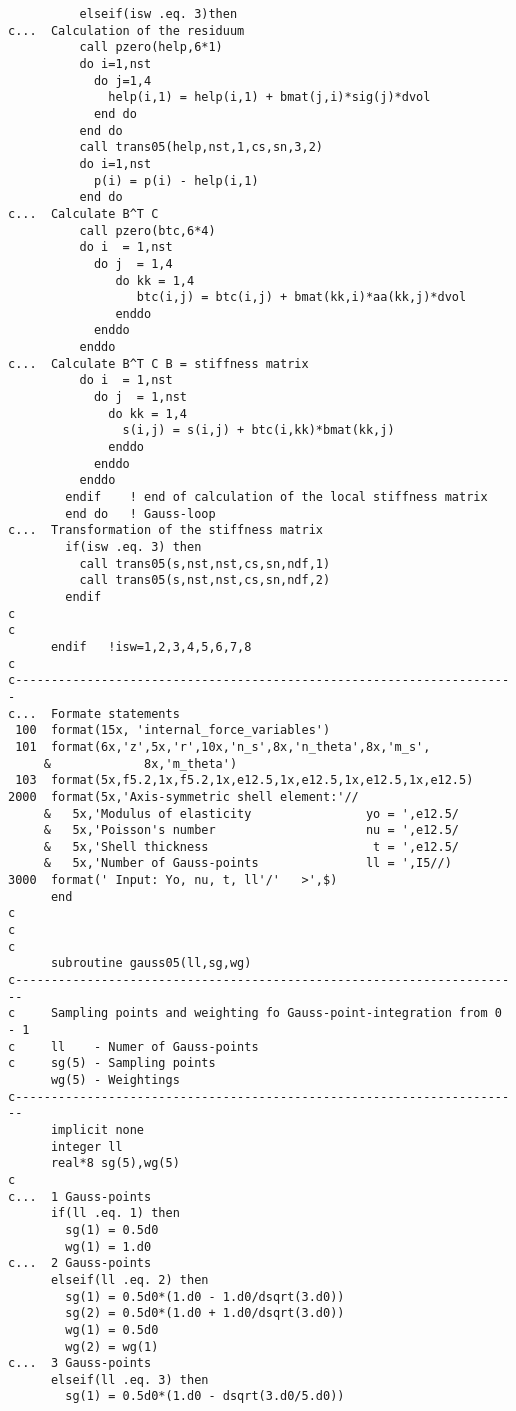 {\begin{verbatim}
          elseif(isw .eq. 3)then
c...  Calculation of the residuum
          call pzero(help,6*1)
          do i=1,nst
            do j=1,4
              help(i,1) = help(i,1) + bmat(j,i)*sig(j)*dvol
            end do
          end do
          call trans05(help,nst,1,cs,sn,3,2)
          do i=1,nst
            p(i) = p(i) - help(i,1)
          end do
c...  Calculate B^T C
          call pzero(btc,6*4)
          do i  = 1,nst
            do j  = 1,4
               do kk = 1,4
                  btc(i,j) = btc(i,j) + bmat(kk,i)*aa(kk,j)*dvol
               enddo
            enddo
          enddo
c...  Calculate B^T C B = stiffness matrix
          do i  = 1,nst
            do j  = 1,nst
              do kk = 1,4
                s(i,j) = s(i,j) + btc(i,kk)*bmat(kk,j)
              enddo
            enddo
          enddo
        endif    ! end of calculation of the local stiffness matrix
        end do   ! Gauss-loop
c...  Transformation of the stiffness matrix
        if(isw .eq. 3) then
          call trans05(s,nst,nst,cs,sn,ndf,1)
          call trans05(s,nst,nst,cs,sn,ndf,2)
        endif
c
c
      endif   !isw=1,2,3,4,5,6,7,8
c
c----------------------------------------------------------------------
c...  Formate statements
 100  format(15x, 'internal_force_variables')
 101  format(6x,'z',5x,'r',10x,'n_s',8x,'n_theta',8x,'m_s',
     &             8x,'m_theta')
 103  format(5x,f5.2,1x,f5.2,1x,e12.5,1x,e12.5,1x,e12.5,1x,e12.5)
2000  format(5x,'Axis-symmetric shell element:'//
     &   5x,'Modulus of elasticity                yo = ',e12.5/
     &   5x,'Poisson's number                     nu = ',e12.5/
     &   5x,'Shell thickness                       t = ',e12.5/
     &   5x,'Number of Gauss-points               ll = ',I5//)
3000  format(' Input: Yo, nu, t, ll'/'   >',$)
      end
c
c
c
      subroutine gauss05(ll,sg,wg)
c-----------------------------------------------------------------------
c     Sampling points and weighting fo Gauss-point-integration from 0 - 1
c     ll    - Numer of Gauss-points
c     sg(5) - Sampling points
      wg(5) - Weightings
c-----------------------------------------------------------------------
      implicit none
      integer ll
      real*8 sg(5),wg(5)
c
c...  1 Gauss-points
      if(ll .eq. 1) then
        sg(1) = 0.5d0
        wg(1) = 1.d0
c...  2 Gauss-points
      elseif(ll .eq. 2) then
        sg(1) = 0.5d0*(1.d0 - 1.d0/dsqrt(3.d0))
        sg(2) = 0.5d0*(1.d0 + 1.d0/dsqrt(3.d0))
        wg(1) = 0.5d0
        wg(2) = wg(1)
c...  3 Gauss-points
      elseif(ll .eq. 3) then
        sg(1) = 0.5d0*(1.d0 - dsqrt(3.d0/5.d0))

\end{verbatim}}

